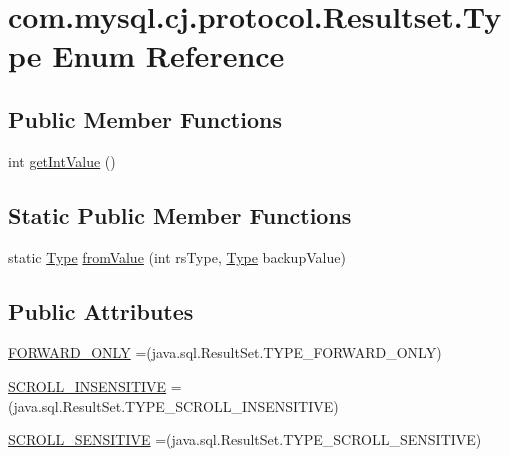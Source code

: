 \hypertarget{enumcom_1_1mysql_1_1cj_1_1protocol_1_1_resultset_1_1_type}{}\section{com.\+mysql.\+cj.\+protocol.\+Resultset.\+Type Enum Reference}
\label{enumcom_1_1mysql_1_1cj_1_1protocol_1_1_resultset_1_1_type}
\subsection*{Public Member Functions}
\begin{DoxyCompactItemize}
\item 
int \mbox{\hyperlink{enumcom_1_1mysql_1_1cj_1_1protocol_1_1_resultset_1_1_type_a2500831bed3fcee1b1cc83dab7e6e7f8}{get\+Int\+Value}} ()
\end{DoxyCompactItemize}
\subsection*{Static Public Member Functions}
\begin{DoxyCompactItemize}
\item 
static \mbox{\hyperlink{enumcom_1_1mysql_1_1cj_1_1protocol_1_1_resultset_1_1_type}{Type}} \mbox{\hyperlink{enumcom_1_1mysql_1_1cj_1_1protocol_1_1_resultset_1_1_type_a174cc1631551f349e2fd24317afe1093}{from\+Value}} (int rs\+Type, \mbox{\hyperlink{enumcom_1_1mysql_1_1cj_1_1protocol_1_1_resultset_1_1_type}{Type}} backup\+Value)
\end{DoxyCompactItemize}
\subsection*{Public Attributes}
\begin{DoxyCompactItemize}
\item 
\mbox{\hyperlink{enumcom_1_1mysql_1_1cj_1_1protocol_1_1_resultset_1_1_type_ad7cddf3eb759b3961780262b09b0217b}{F\+O\+R\+W\+A\+R\+D\+\_\+\+O\+N\+LY}} =(java.\+sql.\+Result\+Set.\+T\+Y\+P\+E\+\_\+\+F\+O\+R\+W\+A\+R\+D\+\_\+\+O\+N\+LY)
\item 
\mbox{\hyperlink{enumcom_1_1mysql_1_1cj_1_1protocol_1_1_resultset_1_1_type_ae4e2e9239fda047eb59e0916b48dee4b}{S\+C\+R\+O\+L\+L\+\_\+\+I\+N\+S\+E\+N\+S\+I\+T\+I\+VE}} =(java.\+sql.\+Result\+Set.\+T\+Y\+P\+E\+\_\+\+S\+C\+R\+O\+L\+L\+\_\+\+I\+N\+S\+E\+N\+S\+I\+T\+I\+VE)
\item 
\mbox{\hyperlink{enumcom_1_1mysql_1_1cj_1_1protocol_1_1_resultset_1_1_type_a61adf90ea3124efe223bb2b80b921233}{S\+C\+R\+O\+L\+L\+\_\+\+S\+E\+N\+S\+I\+T\+I\+VE}} =(java.\+sql.\+Result\+Set.\+T\+Y\+P\+E\+\_\+\+S\+C\+R\+O\+L\+L\+\_\+\+S\+E\+N\+S\+I\+T\+I\+VE)
\end{DoxyCompactItemize}


